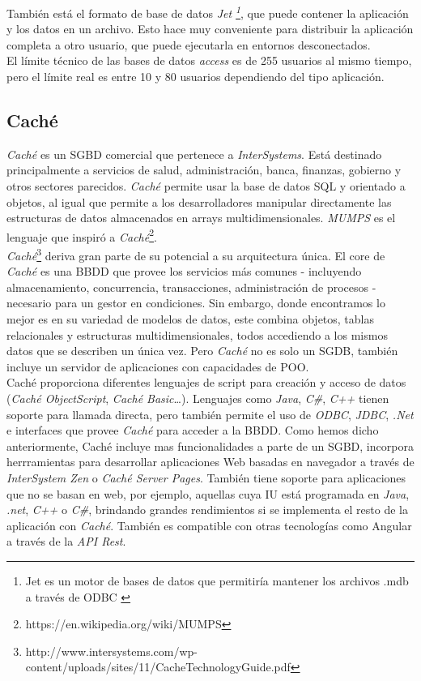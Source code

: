 \documentclass[10pt]{article}
\begin{document}
También está el formato de base de datos \emph{Jet \footnote{Jet es un motor de bases de datos que permitiría mantener los archivos .mdb a través de ODBC \cite{ACC:8}}}, que puede contener la aplicación y los datos en un archivo. Esto hace muy conveniente para distribuir la aplicación completa a otro usuario, que puede ejecutarla en entornos desconectados. \cite{ACC:6}\\

El límite técnico de las bases de datos \emph{access} es de 255 usuarios al mismo tiempo, pero el límite real es entre 10 y 80 usuarios dependiendo del tipo aplicación. \cite{ACC:4}\\

\subsection{Caché}
\emph{Caché} es un SGBD comercial que pertenece a \emph{InterSystems}. Está destinado principalmente a servicios de salud, administración, banca, finanzas, gobierno y otros sectores parecidos. \emph{Caché} permite usar la base de datos SQL y orientado a objetos, al igual que permite a los desarrolladores manipular directamente las estructuras de datos almacenados en arrays multidimensionales. \emph{MUMPS} es el lenguaje que inspiró a \emph{Caché}\footnote{https://en.wikipedia.org/wiki/MUMPS}.\cite{wikiCache}\\

\emph{Caché}\footnote{http://www.intersystems.com/wp-content/uploads/sites/11/CacheTechnologyGuide.pdf} deriva gran parte de su potencial a su arquitectura única. El core de \emph{Caché} es una BBDD que provee los servicios más comunes - incluyendo almacenamiento, concurrencia, transacciones, administración de procesos - necesario para un gestor en condiciones. Sin embargo, donde encontramos lo mejor es en su variedad de modelos de datos, este combina objetos, tablas relacionales y estructuras multidimensionales, todos accediendo a los mismos datos que se describen un única vez. Pero \emph{Caché} no es solo un SGDB, también incluye un servidor de aplicaciones con capacidades de POO.  \\
Caché proporciona diferentes lenguajes de script para creación y acceso de datos (\emph{Caché ObjectScript}, \emph{Caché Basic}…). Lenguajes como \emph{Java},\emph{ C\#}, \emph{C++} tienen soporte para llamada directa, pero también permite el uso de \emph{ODBC}, \emph{JDBC}, \emph{.Net} e interfaces que provee \emph{Caché} para acceder a la BBDD. Como hemos dicho anteriormente, Caché incluye mas funcionalidades a parte de un SGBD, incorpora herrramientas para desarrollar aplicaciones Web basadas en navegador a través de\emph{ InterSystem Zen} o \emph{Caché Server Pages}. También tiene soporte para aplicaciones que no se basan en web, por ejemplo, aquellas cuya IU está programada en \emph{Java}, \emph{.net},\emph{ C++} o\emph{ C\#}, brindando grandes rendimientos si se implementa el resto de la aplicación con \emph{Caché}. También es compatible con otras tecnologías como Angular a través de la \emph{API Rest}.\\
\end{document}
